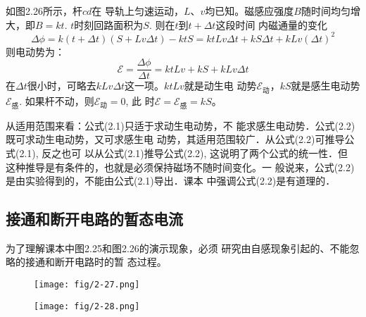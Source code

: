 \begin{figure}[htp]
    \centering
{}
    \caption{}
\end{figure}

如图2.26所示，杆$cd$在
导轨上匀速运动，$L$、$v$均已知。磁感应强度$B$随时间均匀增
大，即$B=kt$. $t$时刻回路面积为$S$. 则在$t$到$t+\Delta t$这段时间
内磁通量的变化 
\[\Delta\phi =k(t+\Delta t)(S+Lv\Delta t)-ktS=ktLv\Delta t
+kS\Delta t+kLv(\Delta t)^2\]
则电动势为：
\[\mathcal{E}=\frac{\Delta\phi}{\Delta t}=ktLv
+kS+kLv\Delta t\]
在$\Delta t$很小时，可略去$kLv\Delta t$这一项。$ktLv$就是动生电
动势$\mathcal{E}_{\text{动}}$，$kS$就是感生电动势$\mathcal{E}_{\text{感}}$. 如果杆不动，则$\mathcal{E}_{\text{动}}=0$, 此
时$\mathcal{E}=\mathcal{E}_{\text{感}}=kS$。

从适用范围来看：公式(2.1)只适于求动生电动势，不
能求感生电动势．公式(2.2)既可求动生电动势，又可求感生电
动势，其适用范围较广．从公式(2.2)可推导公式(2.1), 反之也可
以从公式(2.1)推导公式(2.2), 这说明了两个公式的统一性．但
这种推导是有条件的，也就是必须保持磁场不随时间变化。一
般说来，公式(2.2)是由实验得到的，不能由公式(2.1)导出．课本
中强调公式(2.2)是有道理的．

\subsection{接通和断开电路的暂态电流}
为了理解课本中图2.25和图2.26的演示现象，必须
研究由自感现象引起的、不能忽略的接通和断开电路时的暂
态过程。

\begin{figure}[htp]\centering
    \begin{minipage}[t]{0.48\textwidth}
    \centering
    \texttt{[image: fig/2-27.png]}
    \caption{}
    \end{minipage}
    \begin{minipage}[t]{0.48\textwidth}
    \centering
    \texttt{[image: fig/2-28.png]}
    \caption{}
    \end{minipage}
    \end{figure}

